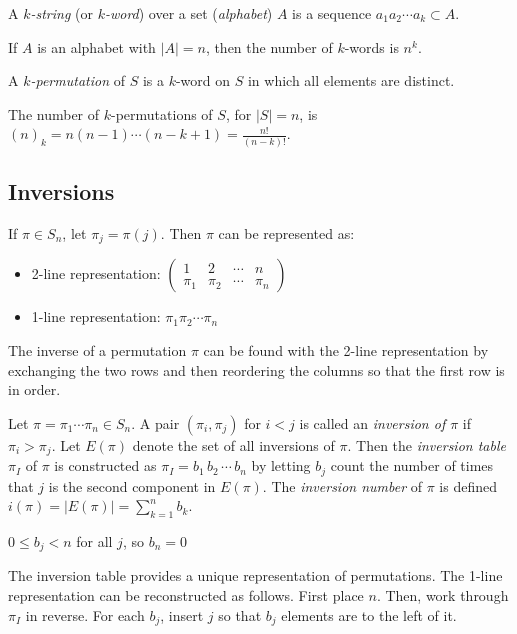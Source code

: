 \documentclass[a4paper]{article}
\begin{document}
\begin{definition}
A \emph{$k$-string} (or \emph{$k$-word}) over a set (\emph{alphabet}) $A$ is a sequence $a_1a_2\cdots a_k\subset A$.
\end{definition}

\begin{theorem}
If $A$ is an alphabet with $|A|=n$, then the number of $k$-words is $n^k$.
\end{theorem}

\begin{definition}
A \emph{$k$-permutation} of $S$ is a $k$-word on $S$ in which all elements are distinct.
\end{definition}

\begin{theorem}
The number of $k$-permutations of $S$, for $|S|=n$, is $(n)_k=n(n-1)\cdots(n-k+1)=\frac{n!}{(n-k)!}$.
\end{theorem}

\subsection{Inversions}

\begin{definition}
If $\pi\in S_n$, let $\pi_j=\pi(j)$. Then $\pi$ can be represented as:
\begin{itemize}
\item 2-line representation: $\displaystyle\begin{pmatrix}1&2&\cdots&n\\\pi_1&\pi_2&\cdots&\pi_n\end{pmatrix}$
\item 1-line representation: $\pi_1\pi_2\cdots\pi_n$
\end{itemize}
\end{definition}

\begin{concept}
The inverse of a permutation $\pi$ can be found with the 2-line representation by exchanging the two rows and then reordering the columns so that the first row is in order.
\end{concept}

\begin{definition}
Let $\pi=\pi_1\cdots\pi_n\in S_n$. A pair $(\pi_i,\pi_j)$ for $i<j$ is called an \emph{inversion of $\pi$} if $\pi_i>\pi_j$. Let $E(\pi)$ denote the set of all inversions of $\pi$. Then the \emph{inversion table} $\pi_I$ of $\pi$ is constructed as $\pi_I=b_1\,b_2\,\cdots\,b_n$ by letting $b_j$ count the number of times that $j$ is the second component in $E(\pi)$. The \emph{inversion number} of $\pi$ is defined $i(\pi)=|E(\pi)|=\sum_{k=1}^nb_k$.
\begin{arrows}
\item $0\leq b_j<n$ for all $j$, so $b_n=0$
\item The inversion table provides a unique representation of permutations. The 1-line representation can be reconstructed as follows. First place $n$. Then, work through $\pi_I$ in reverse. For each $b_j$, insert $j$ so that $b_j$ elements are to the left of it.
\end{arrows}
\end{definition}
\end{document}

